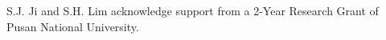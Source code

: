 \documentclass[jkps,preprint,fleqn,showpacs,showkeys]{revtex4}
\begin{document}

\pagebreak

\pagebreak




\begin{acknowledgments}
S.J. Ji and S.H. Lim acknowledge support from a 2-Year Research Grant of Pusan
National University.
\end{acknowledgments}


\end{document}
